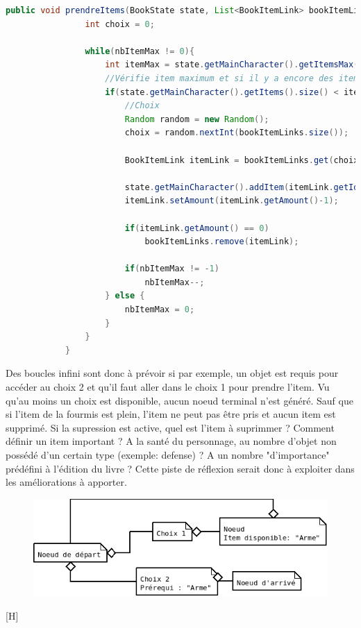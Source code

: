 		\begin{lstlisting}[gobble=12, language=java, label=prendreItemsFourmis, caption=prendreItems() de Fourmis]
			public void prendreItems(BookState state, List<BookItemLink> bookItemLinks, int nbItemMax){
				int choix = 0;

				while(nbItemMax != 0){
					int itemMax = state.getMainCharacter().getItemsMax();
					//Vérifie item maximum et si il y a encore des items à prendre
					if(state.getMainCharacter().getItems().size() < itemMax && !bookItemLinks.isEmpty()){
						//Choix
						Random random = new Random();
						choix = random.nextInt(bookItemLinks.size());

						BookItemLink itemLink = bookItemLinks.get(choix);

						state.getMainCharacter().addItem(itemLink.getId());
						itemLink.setAmount(itemLink.getAmount()-1);

						if(itemLink.getAmount() == 0)
							bookItemLinks.remove(itemLink);

						if(nbItemMax != -1)
							nbItemMax--;
					} else {
						nbItemMax = 0;
					}
				}
			}
		\end{lstlisting}

		Des boucles infini sont donc à prévoir si par exemple, un objet est requis pour accéder au choix 2 et qu'il faut aller dans le choix 1 pour prendre l'item. Vu qu'au moins un choix est disponible, aucun noeud terminal n'est généré. Sauf que si l'item de la fourmis est plein, l'item ne peut pas être pris et aucun item est supprimé. Si la supression est active, quel est l'item à suprimmer ? Comment définir un item important ? A la santé du personnage, au nombre d'objet non possédé d'un certain type (exemple: defense) ? A un nombre "d'importance" prédéfini à l'édition du livre ? Cette piste de réflexion serait donc à exploiter dans les améliorations à apporter.

		\begin{figure}[H]
			\centering\includegraphics{img/fourmisPrendreItemInfiniExemple.png}
		\end{figure}[H]

